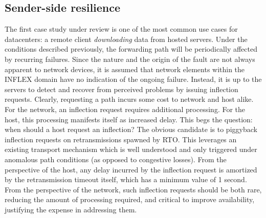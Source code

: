 \subsection{Sender-side resilience}

The first case study under review is one of the most common use cases for datacenters: a remote client \emph{downloading} data from hosted servers.
Under the conditions described previously, the forwarding path will be periodically affected by recurring failures.
Since the nature and the origin of the fault are not always apparent to network devices, it is assumed that network elements within the INFLEX domain have no indication of the ongoing failure.
Instead, it is up to the servers to detect and recover from perceived problems by issuing inflection requests.
Clearly, requesting a path incurs some cost to network and host alike.
For the network, an inflection request requires additional processing.
For the host, this processing manifests itself as increased delay.
This begs the question: when should a host request an inflection?
The obvious candidate is to piggyback inflection requests on retransmissions spawned by \ac{RTO}.
This leverages an existing transport mechanism which is well understood and only triggered under anomalous path conditions (as opposed to congestive losses).
From the perspective of the host, any delay incurred by the inflection request is amortized by the retransmission timeout itself, which has a minimum value of 1 second.
From the perspective of the network, such inflection requests should be both rare, reducing the amount of processing required, and critical to improve availability, justifying the expense in addressing them.

